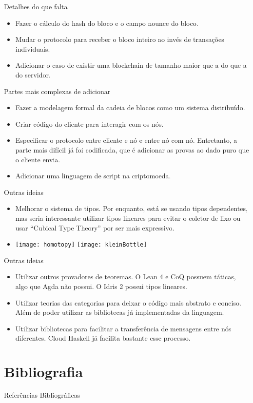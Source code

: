 \documentclass{beamer}
\begin{document}
\begin{frame}{Detalhes do que falta}
  \begin{itemize}
    \item Fazer o cálculo do hash do bloco e o campo nounce do bloco.
    \item Mudar o protocolo para receber o bloco inteiro ao invés de transações individuais.
    \item Adicionar o caso de existir uma blockchain de tamanho maior que a do que a do servidor.
  \end{itemize}
\end{frame}

\begin{frame}{Partes mais complexas de adicionar}
  \begin{itemize}
    \item Fazer a modelagem formal da cadeia de blocos como um sistema distribuído.
    \item Criar código do cliente para interagir com os nós.
    \item Especificar o protocolo entre cliente e nó e entre nó com nó.
      Entretanto, a parte mais difícil já foi codificada, que é adicionar as provas
      ao dado puro que o cliente envia.
    \item Adicionar uma linguagem de script na criptomoeda.
  \end{itemize}
\end{frame}

\begin{frame}{Outras ideias}
  \begin{itemize}
    \item Melhorar o sistema de tipos.
    Por enquanto, está se usando tipos dependentes, mas seria interessante utilizar tipos lineares
    para evitar o coletor de lixo ou usar \foreignquote{english}{Cubical Type Theory} por ser mais expressivo.
  \item
    \texttt{[image: homotopy]}
    \texttt{[image: kleinBottle]}
  \end{itemize}
\end{frame}

\begin{frame}{Outras ideias}
  \begin{itemize}
  \item  Utilizar outros provadores de teoremas.
    O Lean 4 e CoQ possuem táticas, algo que Agda não possui.
    O Idris 2 possui tipos lineares. 
  \item Utilizar teorias das categorias para deixar o código mais abstrato e conciso.
    Além de poder utilizar as bibliotecas já implementadas da linguagem.
  \item Utilizar bibliotecas para facilitar a transferência de mensagens entre nós diferentes.
    Cloud Haskell já facilita bastante esse processo.
  \end{itemize}
\end{frame}


\section{Bibliografia}

\begin{frame}{Referências Bibliográficas}
  
  
\end{frame}
\end{document}
